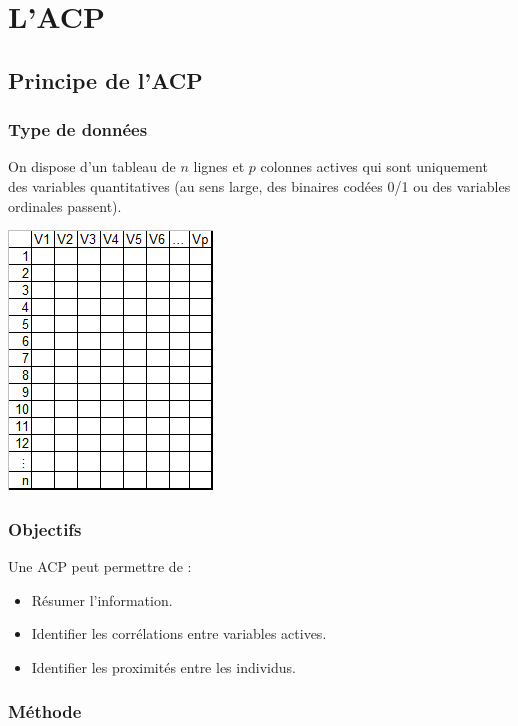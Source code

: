 \documentclass[]{book}
\providecommand{\tightlist}{%
  \setlength{\itemsep}{0pt}\setlength{\parskip}{0pt}}
\begin{document}
\hypertarget{lacp}{%
\chapter{L'ACP}\label{lacp}}

\hypertarget{principe-de-lacp}{%
\section{Principe de l'ACP}\label{principe-de-lacp}}

\hypertarget{type-de-donnees}{%
\subsection{Type de données}\label{type-de-donnees}}

On dispose d'un tableau de \(n\) lignes et \(p\) colonnes actives qui sont uniquement des variables quantitatives (au sens large, des binaires codées 0/1 ou des variables ordinales passent).

\includegraphics{images/DF1.png}

\hypertarget{objectifs-1}{%
\subsection{Objectifs}\label{objectifs-1}}

Une ACP peut permettre de :

\begin{itemize}
\tightlist
\item
  Résumer l'information.
\item
  Identifier les corrélations entre variables actives.
\item
  Identifier les proximités entre les individus.
\end{itemize}

\hypertarget{methode}{%
\subsection{Méthode}\label{methode}}
\end{document}
